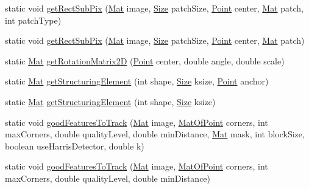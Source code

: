 \begin{DoxyCompactItemize}
static void \mbox{\hyperlink{classorg_1_1opencv_1_1imgproc_1_1_imgproc_aa547e4fbdf1a4806a1fd35ebbfe2a117}{get\+Rect\+Sub\+Pix}} (\mbox{\hyperlink{classorg_1_1opencv_1_1core_1_1_mat}{Mat}} image, \mbox{\hyperlink{classorg_1_1opencv_1_1core_1_1_size}{Size}} patch\+Size, \mbox{\hyperlink{classorg_1_1opencv_1_1core_1_1_point}{Point}} center, \mbox{\hyperlink{classorg_1_1opencv_1_1core_1_1_mat}{Mat}} patch, int patch\+Type)
\item 
static void \mbox{\hyperlink{classorg_1_1opencv_1_1imgproc_1_1_imgproc_a3fd684028b07b7ba5327cb890cca0bbd}{get\+Rect\+Sub\+Pix}} (\mbox{\hyperlink{classorg_1_1opencv_1_1core_1_1_mat}{Mat}} image, \mbox{\hyperlink{classorg_1_1opencv_1_1core_1_1_size}{Size}} patch\+Size, \mbox{\hyperlink{classorg_1_1opencv_1_1core_1_1_point}{Point}} center, \mbox{\hyperlink{classorg_1_1opencv_1_1core_1_1_mat}{Mat}} patch)
\item 
static \mbox{\hyperlink{classorg_1_1opencv_1_1core_1_1_mat}{Mat}} \mbox{\hyperlink{classorg_1_1opencv_1_1imgproc_1_1_imgproc_ac336c5ce363b2561904027535a7edab6}{get\+Rotation\+Matrix2D}} (\mbox{\hyperlink{classorg_1_1opencv_1_1core_1_1_point}{Point}} center, double angle, double scale)
\item 
static \mbox{\hyperlink{classorg_1_1opencv_1_1core_1_1_mat}{Mat}} \mbox{\hyperlink{classorg_1_1opencv_1_1imgproc_1_1_imgproc_a91f9695453e02aa885270c0cb3cb7207}{get\+Structuring\+Element}} (int shape, \mbox{\hyperlink{classorg_1_1opencv_1_1core_1_1_size}{Size}} ksize, \mbox{\hyperlink{classorg_1_1opencv_1_1core_1_1_point}{Point}} anchor)
\item 
static \mbox{\hyperlink{classorg_1_1opencv_1_1core_1_1_mat}{Mat}} \mbox{\hyperlink{classorg_1_1opencv_1_1imgproc_1_1_imgproc_a4e25f50f644c596500ea7cbb7d8f72cf}{get\+Structuring\+Element}} (int shape, \mbox{\hyperlink{classorg_1_1opencv_1_1core_1_1_size}{Size}} ksize)
\item 
static void \mbox{\hyperlink{classorg_1_1opencv_1_1imgproc_1_1_imgproc_a55ca9c014b3e7fcbda05ad5d9e5e2b3e}{good\+Features\+To\+Track}} (\mbox{\hyperlink{classorg_1_1opencv_1_1core_1_1_mat}{Mat}} image, \mbox{\hyperlink{classorg_1_1opencv_1_1core_1_1_mat_of_point}{Mat\+Of\+Point}} corners, int max\+Corners, double quality\+Level, double min\+Distance, \mbox{\hyperlink{classorg_1_1opencv_1_1core_1_1_mat}{Mat}} mask, int block\+Size, boolean use\+Harris\+Detector, double k)
\item 
static void \mbox{\hyperlink{classorg_1_1opencv_1_1imgproc_1_1_imgproc_a1aae3383c84a2d787691a18c05962764}{good\+Features\+To\+Track}} (\mbox{\hyperlink{classorg_1_1opencv_1_1core_1_1_mat}{Mat}} image, \mbox{\hyperlink{classorg_1_1opencv_1_1core_1_1_mat_of_point}{Mat\+Of\+Point}} corners, int max\+Corners, double quality\+Level, double min\+Distance)

\end{DoxyCompactItemize}
